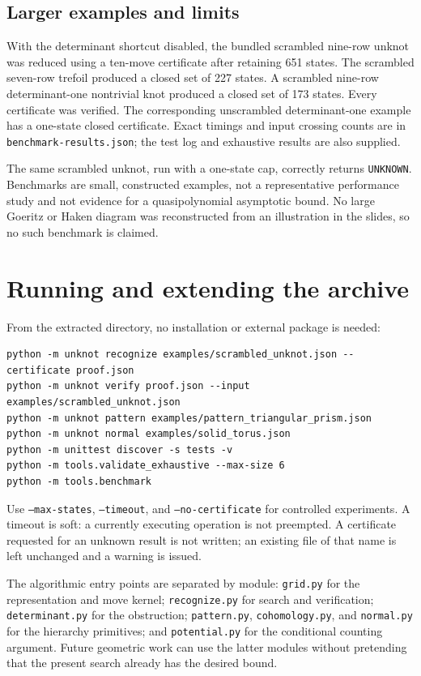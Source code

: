 \documentclass[11pt]{article}
\newcommand{\code}[1]{\texttt{#1}}
\begin{document}
\subsection{Larger examples and limits}
With the determinant shortcut disabled, the bundled scrambled nine-row unknot
was reduced using a ten-move certificate after retaining 651 states. The
scrambled seven-row trefoil produced a closed set of 227 states. A scrambled
nine-row determinant-one nontrivial knot produced a closed set of 173 states.
Every certificate was verified. The corresponding unscrambled determinant-one
example has a one-state closed certificate. Exact timings and input crossing
counts are in \code{benchmark-results.json}; the test log and exhaustive
results are also supplied.

The same scrambled unknot, run with a one-state cap, correctly returns
\code{UNKNOWN}. Benchmarks are small, constructed examples, not a representative
performance study and not evidence for a quasipolynomial asymptotic bound.
No large Goeritz or Haken diagram was reconstructed from an illustration in the
slides, so no such benchmark is claimed.

\section{Running and extending the archive}
From the extracted directory, no installation or external package is needed:
\begin{lstlisting}
python -m unknot recognize examples/scrambled_unknot.json --certificate proof.json
python -m unknot verify proof.json --input examples/scrambled_unknot.json
python -m unknot pattern examples/pattern_triangular_prism.json
python -m unknot normal examples/solid_torus.json
python -m unittest discover -s tests -v
python -m tools.validate_exhaustive --max-size 6
python -m tools.benchmark
\end{lstlisting}
Use \code{--max-states}, \code{--timeout}, and \code{--no-certificate} for
controlled experiments. A timeout is soft: a currently executing operation is
not preempted. A certificate requested for an unknown result is not written;
an existing file of that name is left unchanged and a warning is issued.

The algorithmic entry points are separated by module: \code{grid.py} for the
representation and move kernel; \code{recognize.py} for search and verification;
\code{determinant.py} for the obstruction; \code{pattern.py},
\code{cohomology.py}, and \code{normal.py} for the hierarchy primitives; and
\code{potential.py} for the conditional counting argument. Future geometric
work can use the latter modules without pretending that the present search
already has the desired bound.
\end{document}
